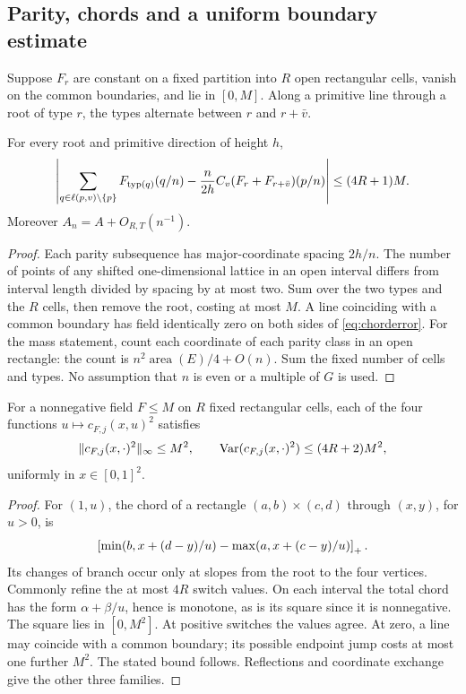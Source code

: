 \subsection{Parity, chords and a uniform boundary estimate}
Suppose \(F_r\) are constant on a fixed partition into \(R\) open
rectangular cells, vanish on the common boundaries, and lie in
\([0,M]\). Along a primitive line through a root of type \(r\), the
types alternate between \(r\) and \(r+\bar v\).

\begin{lemma}\label{lem:chord}
For every root and primitive direction of height \(h\),
\begin{equation}\label{eq:chorderror}
 \left|\sum_{q\in\ell(p,v)\setminus\{p\}}
 F_{\operatorname{typ}(q)}(q/n)
 -\frac n{2h}C_v(F_r+F_{r+\bar v})(p/n)\right|
 \le(4R+1)M.
\end{equation}
Moreover \(A_n=A+O_{R,T}(n^{-1})\).
\end{lemma}
\begin{proof}
Each parity subsequence has major-coordinate spacing \(2h/n\).
The number of points of any shifted one-dimensional lattice in an
open interval differs from interval length divided by spacing by at
most two. Sum over the two types and the \(R\) cells, then remove the
root, costing at most \(M\). A line coinciding with a common boundary
has field identically zero on both sides of \eqref{eq:chorderror}.
For the mass statement, count each coordinate of each parity class
in an open rectangle: the count is
\(n^2\operatorname{area}(E)/4+O(n)\). Sum the fixed number of cells
and types. No assumption that \(n\) is even or a multiple of \(G\)
is used.
\end{proof}

\begin{lemma}\label{lem:bv}
For a nonnegative field \(F\le M\) on \(R\) fixed rectangular cells,
each of the four functions \(u\mapsto c_{F,j}(x,u)^2\) satisfies
\[
 \|c_{F,j}(x,\cdot)^2\|_\infty\le M^2,
 \qquad \operatorname{Var}(c_{F,j}(x,\cdot)^2)\le(4R+2)M^2,
\]
uniformly in \(x\in[0,1]^2\).
\end{lemma}
\begin{proof}
For \((1,u)\), the chord of a rectangle \((a,b)\times(c,d)\) through
\((x,y)\), for \(u>0\), is
\[
 \left[\min(b,x+(d-y)/u)-\max(a,x+(c-y)/u)\right]_+.
\]
Its changes of branch occur only at slopes from the root to the four
vertices. Commonly refine the at most \(4R\) switch values. On each
interval the total chord has the form \(\alpha+\beta/u\), hence is
monotone, as is its square since it is nonnegative. The square lies
in \([0,M^2]\). At positive switches the values agree. At zero, a line
may coincide with a common boundary; its possible endpoint jump costs
at most one further \(M^2\). The stated bound follows. Reflections
and coordinate exchange give the other three families.
\end{proof}

